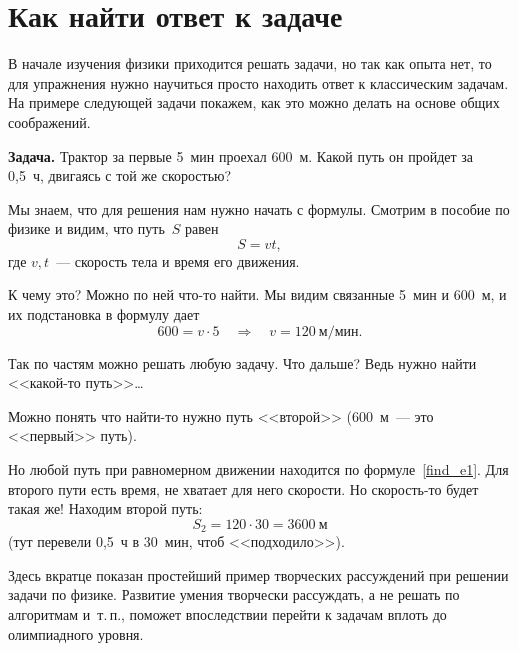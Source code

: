 \documentclass[main.tex]{subfiles}
\begin{document}


 
   


\section{Как найти ответ к задаче}

В начале изучения физики приходится решать задачи, но так как опыта нет, то для упражнения нужно научиться просто находить ответ к классическим задачам. На примере следующей задачи покажем, как это можно делать на основе общих соображений.

\medskip

\noindent\textbf{Задача.} Трактор за первые 5~мин проехал 600~м. Какой путь он пройдет за 0,5~ч, двигаясь с той же скоростью? 

\medskip

Мы знаем, что для решения нам нужно начать с формулы. Смотрим в пособие по физике и видим, что путь~$S$ равен
\begin{equation}
\label{find_e1}
S=vt,
\end{equation}
где $v,t$~--- скорость тела и время его движения.

К чему это? Можно по ней что-то найти. Мы видим связанные 5~мин и 600~м, и их подстановка в формулу дает
$$
600=v\cdot5\quad \Rightarrow\quad v=120~\text{м/мин}.
$$

Так по частям можно решать любую задачу. Что дальше? Ведь нужно найти <<какой-то путь>>\ldots\

Можно понять что найти-то нужно путь <<второй>> (600~м~--- это <<первый>> путь).

Но любой путь при равномерном движении находится по формуле~\eqref{find_e1}. Для второго пути есть время, не хватает для него скорости. Но скорость-то будет такая же! Находим второй путь:
$$
S_2=120\cdot30=3600~\text{м}
$$
(тут перевели 0,5~ч в 30~мин, чтоб <<подходило>>).

\smallskip

Здесь вкратце показан простейший пример творческих рассуждений при решении задачи по физике. Развитие умения творчески рассуждать, а не решать по алгоритмам и~т.\,п., поможет впоследствии перейти к задачам вплоть до олимпиадного уровня. 
\end{document}
